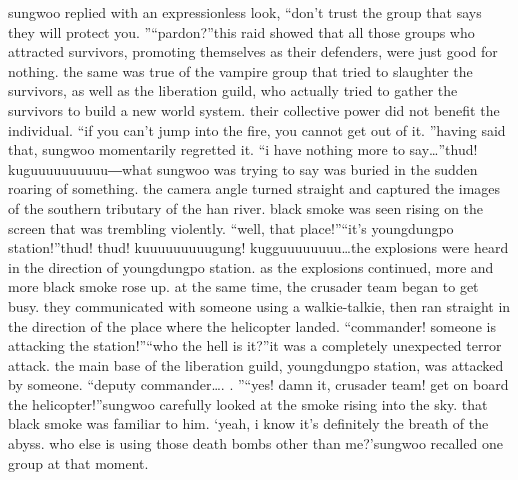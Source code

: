 sungwoo replied with an expressionless look, “don’t trust the group that says they will protect you.
”“pardon?”this raid showed that all those groups who attracted survivors, promoting themselves as their defenders, were just good for nothing.
the same was true of the vampire group that tried to slaughter the survivors, as well as the liberation guild, who actually tried to gather the survivors to build a new world system.
their collective power did not benefit the individual.
“if you can’t jump into the fire, you cannot get out of it.
”having said that, sungwoo momentarily regretted it.
“i have nothing more to say…”thud! kuguuuuuuuuuu―what sungwoo was trying to say was buried in the sudden roaring of something.
the camera angle turned straight and captured the images of the southern tributary of the han river.
 black smoke was seen rising on the screen that was trembling violently.
“well, that place!”“it’s youngdungpo station!”thud! thud! kuuuuuuuuugung! kugguuuuuuuu…the explosions were heard in the direction of youngdungpo station.
 as the explosions continued, more and more black smoke rose up.
at the same time, the crusader team began to get busy.
 they communicated with someone using a walkie-talkie, then ran straight in the direction of the place where the helicopter landed.
“commander! someone is attacking the station!”“who the hell is it?”it was a completely unexpected terror attack.
 the main base of the liberation guild, youngdungpo station, was attacked by someone.
“deputy commander….
.
”“yes! damn it, crusader team! get on board the helicopter!”sungwoo carefully looked at the smoke rising into the sky.
 that black smoke was familiar to him.
‘yeah, i know it’s definitely the breath of the abyss.
 who else is using those death bombs other than me?’sungwoo recalled one group at that moment.


 